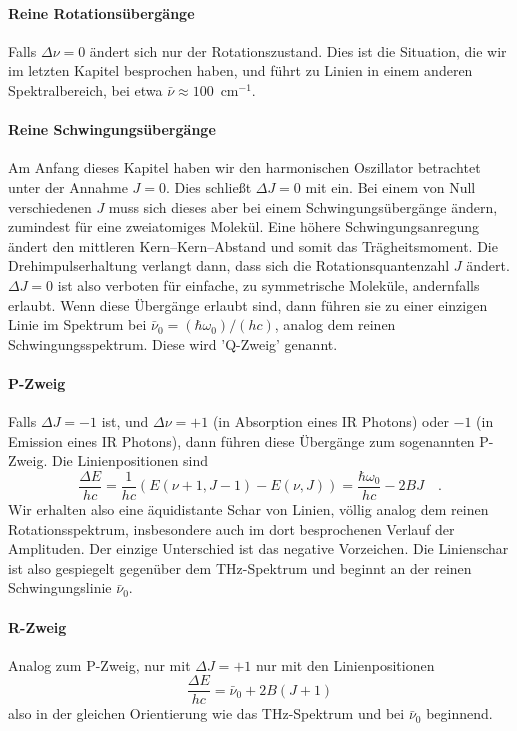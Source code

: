 \paragraph{Reine Rotationsübergänge} Falls $\Delta \nu = 0$ ändert sich nur der Rotationszustand. Dies ist die Situation, die wir im letzten Kapitel besprochen haben, und führt zu Linien  in einem anderen Spektralbereich, bei etwa $\bar{\nu} \approx 100$~cm$^{-1}$.

\paragraph{Reine Schwingungsübergänge} Am Anfang dieses Kapitel haben wir den  harmonischen Oszillator betrachtet unter der Annahme $J=0$. Dies schließt $\Delta J = 0$ mit ein. Bei einem von Null verschiedenen $J$ muss sich dieses aber bei einem Schwingungsübergänge ändern, zumindest für eine zweiatomiges Molekül. Eine höhere Schwingungsanregung ändert den mittleren Kern--Kern--Abstand und somit das Trägheitsmoment. Die Drehimpulserhaltung verlangt dann, dass sich die Rotationsquantenzahl $J$ ändert. $\Delta J = 0$ ist also verboten für einfache, zu symmetrische Moleküle, andernfalls erlaubt. Wenn diese Übergänge erlaubt sind, dann führen sie zu einer einzigen Linie im Spektrum bei $ \bar{\nu}_0 = (\hbar \omega_0)/(h c) $, analog dem reinen Schwingungsspektrum. Diese wird 'Q-Zweig' genannt. 

\paragraph{P-Zweig} Falls $\Delta J = -1$ ist, und $\Delta \nu = +1$ (in Absorption eines IR Photons) oder $-1$ (in Emission eines IR Photons), dann führen diese Übergänge zum sogenannten P-Zweig. Die Linienpositionen sind
\begin{equation}
 \frac{\Delta E}{h c} = \frac{1}{h c} \left( E(\nu +1, J -1) - E(\nu, J) \right) = \frac{\hbar \omega_0}{h c}   - 2 B J \quad .
\end{equation}
Wir erhalten also eine äquidistante Schar von Linien, völlig analog dem reinen Rotationsspektrum, insbesondere auch im dort besprochenen Verlauf der Amplituden. Der einzige Unterschied ist das negative Vorzeichen. Die Linienschar ist also gespiegelt gegenüber dem THz-Spektrum und beginnt an der reinen Schwingungslinie $\bar{\nu}_0 $.

\paragraph{R-Zweig} Analog zum P-Zweig, nur mit  $\Delta J = +1$ nur mit den Linienpositionen
\begin{equation}
 \frac{\Delta E}{h c} =  \bar{\nu}_0   + 2 B ( J +1)
\end{equation}
also in der gleichen Orientierung wie das THz-Spektrum und bei $\bar{\nu}_0 $ beginnend.

